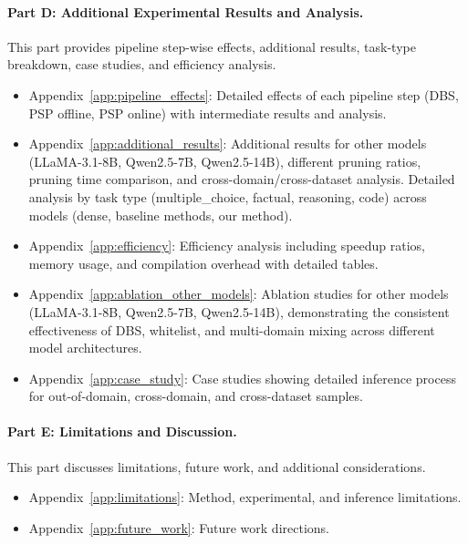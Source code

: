 \paragraph{Part D: Additional Experimental Results and Analysis.}
This part provides pipeline step-wise effects, additional results, task-type breakdown, case studies, and efficiency analysis.
\begin{itemize}
    \item Appendix~\ref{app:pipeline_effects}: Detailed effects of each pipeline step (DBS, PSP offline, PSP online) with intermediate results and analysis.
    \item Appendix~\ref{app:additional_results}: Additional results for other models (LLaMA-3.1-8B, Qwen2.5-7B, Qwen2.5-14B), different pruning ratios, pruning time comparison, and cross-domain/cross-dataset analysis. Detailed analysis by task type (multiple\_choice, factual, reasoning, code) across models (dense, baseline methods, our method).
    \item Appendix~\ref{app:efficiency}: Efficiency analysis including speedup ratios, memory usage, and compilation overhead with detailed tables.
    \item Appendix~\ref{app:ablation_other_models}: Ablation studies for other models (LLaMA-3.1-8B, Qwen2.5-7B, Qwen2.5-14B), demonstrating the consistent effectiveness of DBS, whitelist, and multi-domain mixing across different model architectures.
    \item Appendix~\ref{app:case_study}: Case studies showing detailed inference process for out-of-domain, cross-domain, and cross-dataset samples.
\end{itemize}

\paragraph{Part E: Limitations and Discussion.}
This part discusses limitations, future work, and additional considerations.
\begin{itemize}
    \item Appendix~\ref{app:limitations}: Method, experimental, and inference limitations.
    \item Appendix~\ref{app:future_work}: Future work directions.
\end{itemize}


\clearpage
{}

